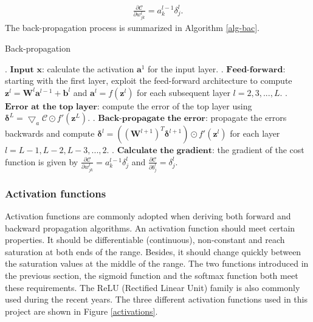 \documentclass[a4paper]{article}
\begin{document}
\begin{align}
    \frac{\partial \mathcal{C}}{\partial w^l_{jk}} = a_k^{l-1} \delta^l_j.
    \label{delta_j^l}
\end{align}
The back-propagation process is summarized in Algorithm \ref{alg-bac}.
\begin{algorithm}[H]
    \caption{Back-propagation}
    \label{alg-bac}
    \begin{algorithmic}
        . $\textbf{Input $\mathbf{x}$:}$ calculate the activation $\mathbf{a}^{1}$ for the input layer.
        . $\textbf{Feed-forward:}$ starting with the first layer, exploit the feed-forward architecture to compute $\mathbf{z}^{l}=\mathbf{W}^{l}\mathbf{a}^{l-1}+\mathbf{b}^{l}$ and $\mathbf{a}^{l}=f(\mathbf{z}^{l})$ for each subsequent layer $l=2,3,...,L$.
        . $\textbf{Error at the top layer:}$ compute the error of the top layer using $\mathbf{\delta}^{L}= {\bigtriangledown}_{a} \mathcal{C} \odot f'(\mathbf{z}^L)$.
        . $\textbf{Back-propagate the error:}$ propagate the errors backwards and compute $\mathbf{\delta}^l = ((\mathbf{W}^{l+1})^T \mathbf{\delta}^{l+1}) \odot f'(\mathbf{z}^l)$ for each layer $l=L-1,L-2,L-3,...,2$.
        . $\textbf{Calculate the gradient:}$ the gradient of the cost function is given by $\frac{\partial \mathcal{C}}{\partial w^l_{jk}} = a_k^{l-1} \delta^l_j$ and $\frac{\partial \mathcal{C}}{\partial b^l_j} = \delta^l_j$.
    \end{algorithmic}
\end{algorithm}

\subsubsection{Activation functions}
Activation functions are commonly adopted when deriving both forward and backward propagation algorithms. An activation function should meet certain properties. It should be differentiable (continuous), non-constant and reach saturation at both ends of the range. Besides, it should change quickly between the saturation values  at the middle of the range. The two functions introduced in the previous section, the sigmoid function and the softmax function both meet these requirements. The ReLU (Rectified Linear Unit) family is also commonly used during the recent years. The three different activation functions used in this project are shown in Figure \ref{activations}.
\end{document}
